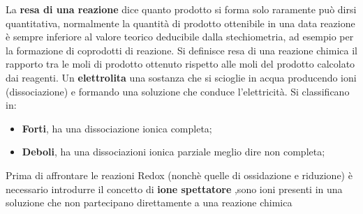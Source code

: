 \documentclass[11pt, a4paper, openright]{book}
\begin{document}
La \textbf{resa di una reazione} dice quanto prodotto si forma solo raramente può dirsi quantitativa,
normalmente la quantità di prodotto ottenibile in una data
reazione è sempre inferiore al valore teorico deducibile dalla
stechiometria, ad esempio per la formazione di coprodotti di
reazione. 
Si definisce resa di una reazione chimica
il rapporto tra le moli di prodotto ottenuto
rispetto alle moli del prodotto calcolato dai reagenti. 
Un \textbf{elettrolita}  una sostanza che si scioglie in acqua
producendo ioni (dissociazione) e formando una soluzione che
conduce l'elettricità. Si classificano in:
\begin{itemize}
    \item \textbf{Forti}, ha una dissociazione ionica completa;
    \item \textbf{Deboli}, ha una dissociazioni ionica parziale meglio dire non completa;
\end{itemize}
Prima di affrontare le reazioni Redox (nonchè quelle di ossidazione e riduzione) è necessario introdurre il concetto di \textbf{ione spettatore} ,sono ioni presenti in una soluzione che non partecipano direttamente a una reazione chimica
\

\newpage
\end{document}
